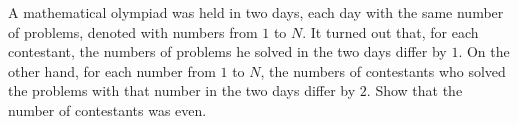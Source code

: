 \problem
A mathematical olympiad was held in two days, each day with the same number of
problems, denoted with numbers from $1$ to $N$.
It turned out that, for each contestant, the numbers of problems he solved in
the two days differ by $1$.
On the other hand, for each number from $1$ to $N$, the numbers of contestants
who solved the problems with that number in the two days differ by $2$.
Show that the number of contestants was even.
\solution
\endproblem
